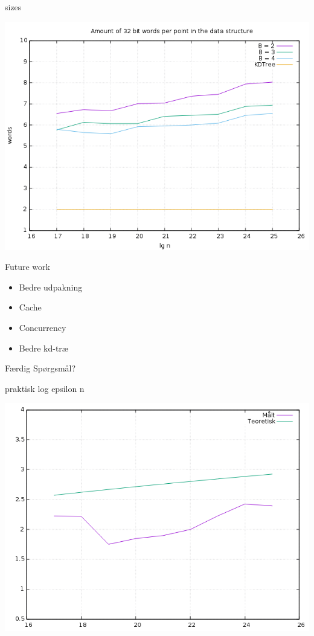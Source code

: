 \documentclass[pdf]{beamer}
\begin{document}
\begin{frame}{sizes}
  \begin{center}
    \includegraphics[scale=0.35]{pictures/analysis/sizes.png}
  \end{center}
\end{frame}

\begin{frame}{Future work}
  \begin{itemize}
    \item Bedre udpakning
    \item Cache
    \item Concurrency
    \item Bedre kd-træ
  \end{itemize}
\end{frame}

\begin{frame}{Færdig}
  Spørgsmål?
\end{frame}


\begin{frame}{praktisk log epsilon n}
  \begin{center}
    \includegraphics[scale=0.35]{pictures/theory_vs_actual.png}
  \end{center}
\end{frame}
\end{document}
